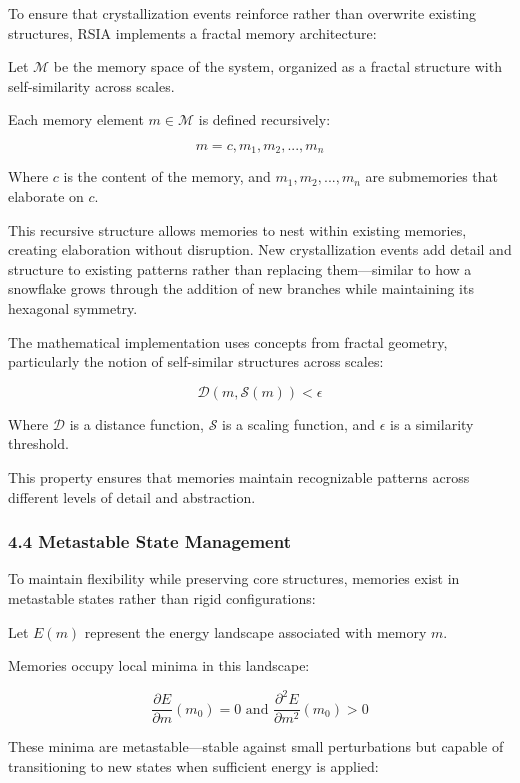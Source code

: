 \documentclass[12pt]{article}
\begin{document}
To ensure that crystallization events reinforce rather than overwrite
existing structures, RSIA implements a fractal memory architecture:

Let \(\mathcal{M}\) be the memory space of the system, organized as a
fractal structure with self-similarity across scales.

Each memory element \(m \in \mathcal{M}\) is defined recursively:

\[m = {c, {m_1, m_2, ..., m_n}}\]

Where \(c\) is the content of the memory, and \({m_1, m_2, ..., m_n}\)
are submemories that elaborate on \(c\).

This recursive structure allows memories to nest within existing
memories, creating elaboration without disruption. New crystallization
events add detail and structure to existing patterns rather than
replacing them---similar to how a snowflake grows through the addition
of new branches while maintaining its hexagonal symmetry.

The mathematical implementation uses concepts from fractal geometry,
particularly the notion of self-similar structures across scales:

\[\mathcal{D}(m, \mathcal{S}(m)) < \epsilon\]

Where \(\mathcal{D}\) is a distance function, \(\mathcal{S}\) is a
scaling function, and \(\epsilon\) is a similarity threshold.

This property ensures that memories maintain recognizable patterns
across different levels of detail and abstraction.

\subsubsection{4.4 Metastable State
Management}\label{metastable-state-management}

To maintain flexibility while preserving core structures, memories exist
in metastable states rather than rigid configurations:

Let \(E(m)\) represent the energy landscape associated with memory
\(m\).

Memories occupy local minima in this landscape:

\[\frac{\partial E}{\partial m}(m_0) = 0 \text{ and } \frac{\partial^2 E}{\partial m^2}(m_0) > 0\]

These minima are metastable---stable against small perturbations but
capable of transitioning to new states when sufficient energy is
applied:
\end{document}
